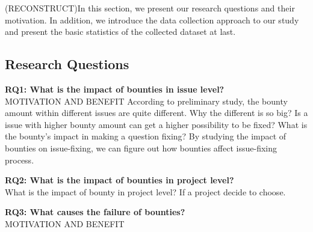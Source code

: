 
(RECONSTRUCT)In this section, we present our research questions and their motivation. In addition, we introduce the data collection approach to our study and present the basic statistics of the collected dataset at last. 
\subsection{Research Questions}

\textbf{RQ1: What is the impact of bounties in issue level?}\\
MOTIVATION AND BENEFIT
According to preliminary study, the bounty amount within different issues are quite different. Why the different is so big? Is a issue with higher bounty amount can get a higher possibility to be fixed? What is the bounty's impact in making a question fixing?
By studying the impact of bounties on issue-fixing, we can figure out how bounties affect issue-fixing process.



\noindent\textbf{RQ2: What is the impact of bounties in project level?}\\
What is the impact of bounty in project level? If a project decide to choose.

\noindent\textbf{RQ3: What causes the failure of bounties?}\\
MOTIVATION AND BENEFIT
